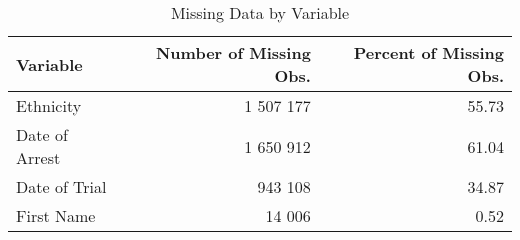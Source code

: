 \begin{table}[t]

\caption{\label{tab:missing_data_count}Missing Data by Variable}
\centering
\begin{tabular}{lrr}
\toprule
Variable & Number of Missing Obs. & Percent of Missing Obs.\\
\midrule
Ethnicity & 1 507 177 & 55.73\\
Date of Arrest & 1 650 912 & 61.04\\
Date of Trial & 943 108 & 34.87\\
First Name & 14 006 & 0.52\\
\bottomrule
\end{tabular}
\end{table}